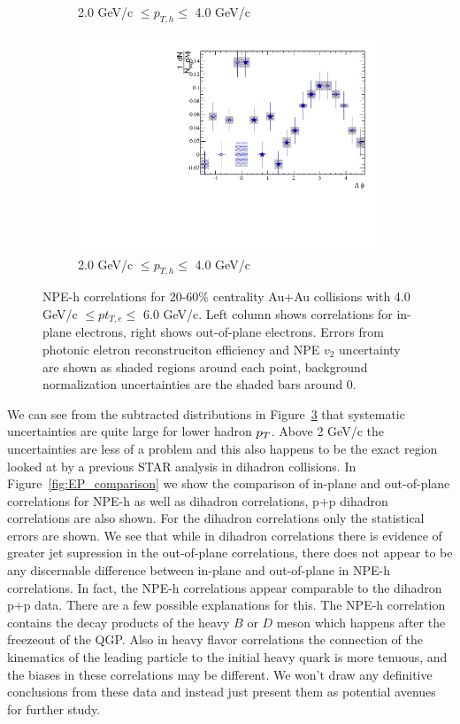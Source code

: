 \begin{figure}[htbp]
\begin{subfigure}{0.5\textwidth}
		\caption{2.0 GeV/c $\leq p_{T,h} \leq$ 4.0 GeV/c}
		\label{fig:EP_corr_subtracted_e}
	\end{subfigure}	
	\begin{subfigure}{0.5\textwidth}
		\includegraphics[width=.9\textwidth]{Plots/Correlations/EP/subtracted/NPE_subtracted_eh_corr_outplane_primpt_4_5_cent_2_5_assopt_3_4.pdf}
		\caption{2.0 GeV/c $\leq p_{T,h} \leq$ 4.0 GeV/c}
		\label{fig:EP_corr_subtracted_f}
	\end{subfigure}	
\caption[Subtracted NPE-hadron Correlations, In-plane and Out-of-plane]{NPE-h correlations for 20-60\% centrality Au+Au collisions with 4.0 GeV/c $\leq pt_{T,e} \leq$ 6.0 GeV/c. Left column shows correlations for in-plane electrons, right shows out-of-plane electrons. Errors from photonic eletron reconstruciton efficiency and NPE $v_2$ uncertainty are shown as shaded regions around each point, background normalization uncertainties are the shaded bars around 0.}
\label{fig:EP_corr_subtracted}
\end{figure}

We can see from the subtracted distributions in Figure~\ref{fig:EP_corr_subtracted} that systematic uncertainties are quite large for lower hadron $p_{T}$. Above 2 GeV/c the uncertainties are less of a problem and this also happens to be the exact region looked at by a previous STAR analysis in dihadron collisions. In Figure~\ref{fig:EP_comparison} we show the comparison of in-plane and out-of-plane correlations for NPE-h as well as dihadron correlations, p+p dihadron correlations are also shown. For the dihadron correlations only the statistical errors are shown. We see that while in dihadron correlations there is evidence of greater jet supression in the out-of-plane correlations, there does not appear to be any discernable difference between in-plane and out-of-plane in NPE-h correlations. In fact, the NPE-h correlations appear comparable to the dihadron p+p data. There are a few possible explanations for this. The NPE-h correlation contains the decay products of the heavy $B$ or $D$ meson which happens after the freezeout of the QGP. Also in heavy flavor correlations the connection of the kinematics of the leading particle to the initial heavy quark is more tenuous, and the biases in these correlations may be different. We won't draw any definitive conclusions from these data and instead just present them as potential avenues for further study.

